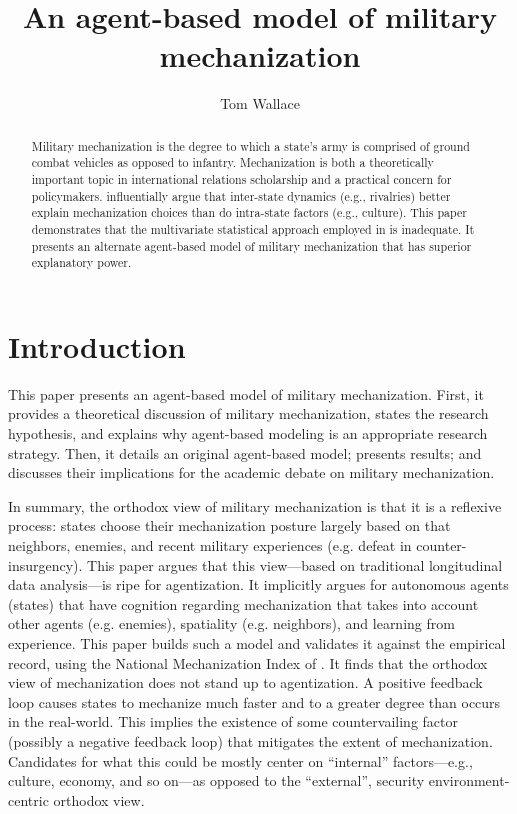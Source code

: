 \documentclass{article}
\title{An agent-based model of military mechanization}
\author{Tom Wallace}
\begin{document}
\maketitle

\begin{abstract}

Military mechanization is the degree to which a state's army is comprised of
ground combat vehicles as opposed to infantry. Mechanization is both a 
theoretically important topic in international relations scholarship and a practical 
concern for policymakers. \citet{sechser2010army} influentially argue that
inter-state dynamics (e.g., rivalries) better explain mechanization choices than do
intra-state factors (e.g., culture). This paper demonstrates that
the multivariate statistical approach employed in \citet{sechser2010army} is inadequate. 
It presents an alternate agent-based model of military mechanization that has superior explanatory power.

\end{abstract}

\newpage

\section{Introduction}

This paper presents an agent-based model of military mechanization. First, it
provides a theoretical discussion of military mechanization, states the research
hypothesis, and explains why agent-based modeling is an appropriate research strategy.
Then, it details an original agent-based model; presents results; and discusses
their implications for the academic debate on military mechanization.

In summary, the orthodox view of military mechanization is that it is a
reflexive process: states choose their mechanization posture largely based on
that neighbors, enemies, and recent military experiences (e.g. defeat in
counter-insurgency). This paper argues
that this view---based on traditional longitudinal data analysis---is ripe for
agentization. It implicitly argues for autonomous agents (states) that have
cognition regarding mechanization that takes into account other agents (e.g.
enemies), spatiality (e.g. neighbors), and learning from experience. This paper
builds such a model and validates it against the empirical record, using the
National Mechanization Index of \citet{sechser2010army}. It finds that the 
orthodox view of mechanization does not stand up to agentization. A positive feedback loop 
causes states to
mechanize much faster and to a greater degree than occurs in the real-world.
This implies the existence of some countervailing factor (possibly a negative
feedback loop) that mitigates the extent of mechanization. Candidates for what
this could be mostly center on ``internal'' factors---e.g., culture, economy,
and so on---as opposed to the ``external'', security environment-centric
orthodox view.
\end{document}

